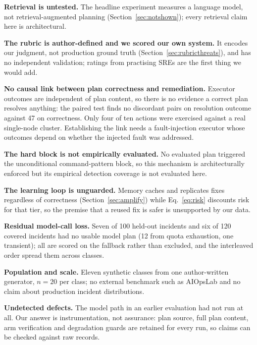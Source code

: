 \documentclass[conference]{IEEEtran}
\begin{document}
\textbf{Retrieval is untested.} The headline experiment measures a
language model, not retrieval-augmented planning
(Section~\ref{sec:notshown}); every retrieval claim here is
architectural.

\textbf{The rubric is author-defined and we scored our own system.} It
encodes our judgment, not production ground truth
(Section~\ref{sec:rubricthreats}), and has no independent validation;
ratings from practising SREs are the first thing we would add.

\textbf{No causal link between plan correctness and remediation.}
Executor outcomes are independent of plan content, so there is no
evidence a correct plan resolves anything: the paired test finds no
discordant pairs on resolution outcome against 47 on correctness. Only
four of ten actions were exercised against a real single-node cluster.
Establishing the link needs a fault-injection executor whose outcomes
depend on whether the injected fault was addressed.

\textbf{The hard block is not empirically evaluated.} No evaluated plan
triggered the unconditional command-pattern block, so this mechanism is
architecturally enforced but its empirical detection coverage is not
evaluated here.

\textbf{The learning loop is unguarded.} Memory caches and replicates
fixes regardless of correctness (Section~\ref{sec:amplify}) while
Eq.~\eqref{eq:risk} discounts risk for that tier, so the premise that a
reused fix is safer is unsupported by our data.

\textbf{Residual model-call loss.} Seven of 100 held-out incidents and
six of 120 covered incidents had no usable model plan (12 from quota
exhaustion, one transient); all are scored on the fallback rather than
excluded, and the interleaved order spread them across classes.

\textbf{Population and scale.} Eleven synthetic classes from one
author-written generator, $n{=}20$ per class; no external benchmark such
as AIOpsLab and no claim about production incident distributions.

\textbf{Undetected defects.} The model path in an earlier evaluation had
not run at all. Our answer is instrumentation, not assurance: plan
source, full plan content, arm verification and degradation guards are
retained for every run, so claims can be checked against raw records.
\end{document}
